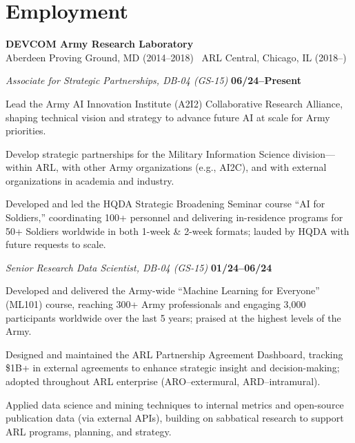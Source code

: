 \section{\sc Employment}

{\bf DEVCOM Army Research Laboratory} \\ 
Aberdeen Proving Ground, MD (2014--2018) \textbar~ARL Central, Chicago, IL (2018--) \\
\vspace*{-.1in}
\begin{list1}
\item[] {\em Associate for Strategic Partnerships, DB-04 (GS-15)} \hfill    {\bf {06/24--Present}}

\begin{list2}
\vspace*{.05in}
\item[\textrightarrow] Lead the Army AI Innovation Institute (A2I2) Collaborative Research Alliance, shaping technical vision and strategy to advance future AI at scale for Army priorities.
\item[\textrightarrow] Develop strategic partnerships for the Military Information Science division---within ARL, with other Army organizations (e.g., AI2C), and with external organizations in academia and industry.
\item[\textrightarrow] Developed and led the HQDA Strategic Broadening Seminar course ``AI for Soldiers,'' coordinating 100+ personnel and delivering in-residence programs for 50+ Soldiers worldwide in both 1-week \& 2-week formats; lauded by HQDA with future requests to scale.
\end{list2}

\vspace*{.15in}
\item[] {\em Senior Research Data Scientist, DB-04 (GS-15)} \hfill    {\bf {01/24--06/24}}

\begin{list2}
\vspace*{.05in}
\item[\textrightarrow] Developed and delivered the Army-wide ``Machine Learning for Everyone'' (ML101) course, reaching 300+ Army professionals and engaging 3,000 participants worldwide over the last 5 years; praised at the highest levels of the Army.
\item[\textrightarrow] Designed and maintained the ARL Partnership Agreement Dashboard, tracking \$1B+ in external agreements to enhance strategic insight and decision-making; adopted throughout ARL enterprise (ARO--extermural, ARD--intramural).
\item[\textrightarrow] Applied data science and mining techniques to internal metrics and open-source publication data (via external APIs), building on sabbatical research to support ARL programs, planning, and strategy.
\end{list2}


\end{list1}
